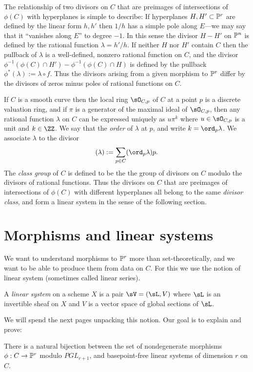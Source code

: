 The relationship of two divisors on $C$ that are preimages of intersections of $\phi(C)$ with hyperplanes is simple to describe: If hyperplanes
$H, H'\subset \PP^r$ are defined by the linear form $h, h'$  then $1/h$ has a simple pole along $E$---we may say that it ``vanishes along $E$'' to degree $-1$.
In this sense the divisor $H-H'$ on $\PP^n$ is defined by the rational function $\lambda= h'/h$. If neither $H$ nor $H'$ contain $C$ then the pullback of $\lambda$ is a well-defined, nonzero rational function on $C$, and the divisor 
$\phi^{-1}(\phi(C)\cap H') - \phi^{-1}(\phi(C)\cap H)$ is defined by the pullback  $\phi^*(\lambda) := \lambda \circ f$. Thus the divisors arising from a given morphism to $\PP^{r}$ differ by the divisors of zeros minus poles of rational functions on $C$. 

If $C$ is a smooth curve then the local ring $\sO_{C,p}$ of $C$ at a point $p$ is a discrete valuation ring, and if $\pi$ is a generator of the maximal ideal of $\sO_{C,p}$, then any rational
function $\lambda$ on $C$ can be expressed uniquely as $u\pi^k$ where $u\in \sO_{C,p}$ is a unit and $k\in \ZZ$. We say that
the \emph{order} of $\lambda$ at $p$, and write $k = \ord_p \lambda$. We associate $\lambda$ to the divisor
$$
(\lambda) := \sum_{p\in C} (\ord_p\lambda)p.
$$
The \emph{class group} of $C$ is defined to be the the group of divisors on $C$ modulo the divisors of rational functions.
Thus the divisors on $C$ that are preimages of intersections of $\phi(C)$ with different hyperplanes all belong to the same
\emph{divisor class}, and form a linear system in the sense of the following section.

\section{Morphisms and linear systems}
We want to understand morphisms to $\PP^r$ more than set-theoretically, and we want to be able to produce them from data on $C$. For this we use the notion of linear system (sometimes called linear series). 

\begin{definition}
 A \emph{linear system} on a scheme $X$ is a pair $\sV  = (\sL, V)$ where $\sL$ is an invertible sheaf on $X$ and
 $V$ is a vector space of global sections of $\sL$. 
\end{definition}

We will spend the next pages unpacking this notion. Our goal is to explain and prove:
\begin{theorem}\label{morphisms and linear systems}
There is a natural bijection between the set of nondegenerate morphisms $\phi : C \to \PP^r$ modulo $PGL_{r+1}$, and basepoint-free linear systems of dimension $r$ on $C$.
\end{theorem}

